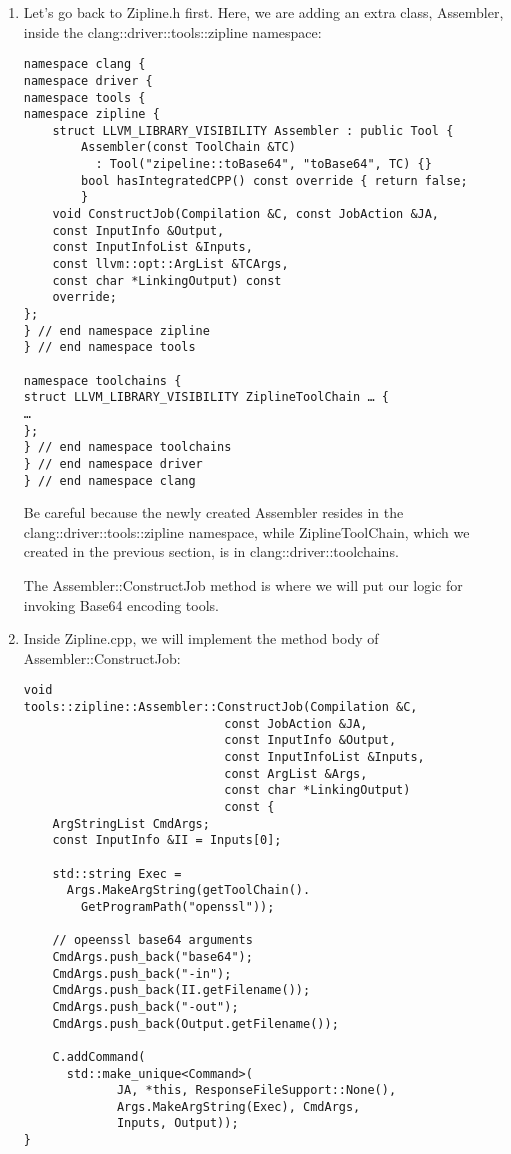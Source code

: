 \begin{enumerate}
\item Let's go back to Zipline.h first. Here, we are adding an extra class, Assembler, inside the clang::driver::tools::zipline namespace:

\begin{lstlisting}[style=styleCXX]
namespace clang {
namespace driver {
namespace tools {
namespace zipline {
	struct LLVM_LIBRARY_VISIBILITY Assembler : public Tool {
		Assembler(const ToolChain &TC)
		  : Tool("zipeline::toBase64", "toBase64", TC) {}
		bool hasIntegratedCPP() const override { return false;
		}
	void ConstructJob(Compilation &C, const JobAction &JA,
	const InputInfo &Output,
	const InputInfoList &Inputs,
	const llvm::opt::ArgList &TCArgs,
	const char *LinkingOutput) const
	override;
};
} // end namespace zipline
} // end namespace tools

namespace toolchains {
struct LLVM_LIBRARY_VISIBILITY ZiplineToolChain … {
…
};
} // end namespace toolchains
} // end namespace driver
} // end namespace clang
\end{lstlisting}

Be careful because the newly created Assembler resides in the clang::driver::tools::zipline namespace, while ZiplineToolChain, which we created in the previous section, is in clang::driver::toolchains.

The Assembler::ConstructJob method is where we will put our logic for invoking Base64 encoding tools.

\item Inside Zipline.cpp, we will implement the method body of Assembler::ConstructJob:

\begin{lstlisting}[style=styleCXX]
void
tools::zipline::Assembler::ConstructJob(Compilation &C,
							const JobAction &JA,
							const InputInfo &Output,
							const InputInfoList &Inputs,
							const ArgList &Args,
							const char *LinkingOutput)
							const {
	ArgStringList CmdArgs;
	const InputInfo &II = Inputs[0];
	
	std::string Exec =
	  Args.MakeArgString(getToolChain().
	    GetProgramPath("openssl"));
	
	// opeenssl base64 arguments
	CmdArgs.push_back("base64");
	CmdArgs.push_back("-in");
	CmdArgs.push_back(II.getFilename());
	CmdArgs.push_back("-out");
	CmdArgs.push_back(Output.getFilename());
	
	C.addCommand(
	  std::make_unique<Command>(
	  		 JA, *this, ResponseFileSupport::None(),
	         Args.MakeArgString(Exec), CmdArgs,
             Inputs, Output));
}
\end{lstlisting}


\end{enumerate}
